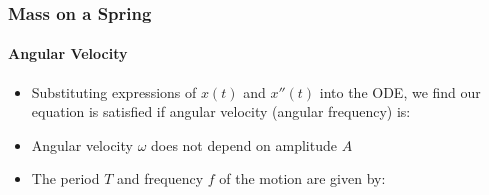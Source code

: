 \documentclass[12pt,compress,aspectratio=169]{beamer}
\begin{document}
\begin{frame}
  \frametitle{Mass on a Spring}
  \framesubtitle{Angular Velocity}
  \begin{itemize}
  \item Substituting expressions of $x(t)$ and $x''(t)$ into the ODE, we find
    our equation is satisfied if angular velocity (angular frequency) is:

  \item Angular velocity $\omega$ does not depend on amplitude $A$

  \item The period $T$ and frequency $f$ of the motion are given by:

  \end{itemize}
\end{frame}
\end{document}
